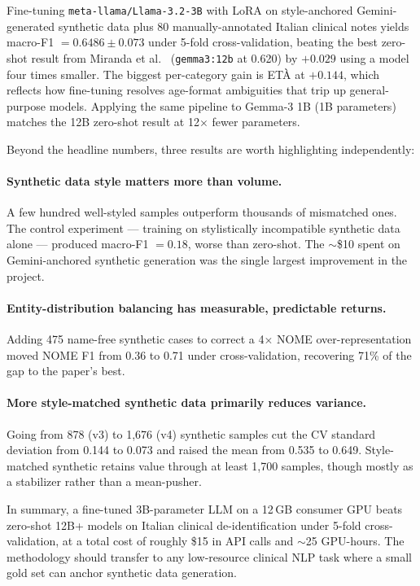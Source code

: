\documentclass[11pt,a4paper]{article}
\begin{document}
Fine-tuning \texttt{meta-llama/Llama-3.2-3B} with LoRA on style-anchored Gemini-generated synthetic data plus 80 manually-annotated Italian clinical notes yields macro-F1 $= 0.6486 \pm 0.073$ under 5-fold cross-validation, beating the best zero-shot result from Miranda et al.\ \cite{miranda2025mamma} (\texttt{gemma3:12b} at 0.620) by $+0.029$ using a model four times smaller. The biggest per-category gain is ETÀ at $+0.144$, which reflects how fine-tuning resolves age-format ambiguities that trip up general-purpose models. Applying the same pipeline to Gemma-3 1B (1B parameters) matches the 12B zero-shot result at 12$\times$ fewer parameters.

Beyond the headline numbers, three results are worth highlighting independently:

\paragraph{Synthetic data style matters more than volume.} A few hundred well-styled samples outperform thousands of mismatched ones. The control experiment — training on stylistically incompatible synthetic data alone — produced macro-F1 $= 0.18$, worse than zero-shot. The $\sim$\$10 spent on Gemini-anchored synthetic generation was the single largest improvement in the project.

\paragraph{Entity-distribution balancing has measurable, predictable returns.} Adding 475 name-free synthetic cases to correct a 4$\times$ NOME over-representation moved NOME F1 from 0.36 to 0.71 under cross-validation, recovering 71\% of the gap to the paper's best.

\paragraph{More style-matched synthetic data primarily reduces variance.} Going from 878 (v3) to 1{,}676 (v4) synthetic samples cut the CV standard deviation from 0.144 to 0.073 and raised the mean from 0.535 to 0.649. Style-matched synthetic retains value through at least 1{,}700 samples, though mostly as a stabilizer rather than a mean-pusher.

In summary, a fine-tuned 3B-parameter LLM on a 12\,GB consumer GPU beats zero-shot 12B+ models on Italian clinical de-identification under 5-fold cross-validation, at a total cost of roughly \$15 in API calls and $\sim$25 GPU-hours. The methodology should transfer to any low-resource clinical NLP task where a small gold set can anchor synthetic data generation.
\end{document}
